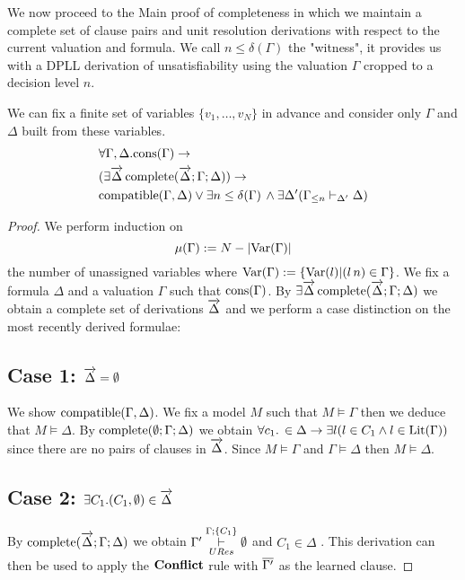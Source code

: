 We now proceed to the Main proof of completeness in which we maintain a complete set of clause pairs and unit resolution derivations with respect to the current valuation and formula. We call $n \leq \delta(\Gamma)$  the "witness", it provides us with a DPLL derivation of unsatisfiability using the valuation $\Gamma$ cropped to a decision level $n$.\\
\medskip
\begin{mytheorem}\label{thm:moddpllcompleteness} 
We can fix a finite set of variables $\{v_1, \ldots , v_N \}$ in advance and consider only $\Gamma$ and $\Delta$ built from these variables.
\begin{align*}
 &\forall \Gamma, \Delta. \mathrm{cons}(\Gamma) \to   \\ 
& (\exists \overrightarrow{\Delta} \, \mathrm{complete}(\overrightarrow{\Delta};\Gamma; \Delta)) \to \\
&\mathrm{compatible}(\Gamma,\Delta) \vee  \exists n \leq \delta(\Gamma) \, \wedge  \exists \Delta' ( \Gamma_{\leq n}  \vdash_{\Delta'} \Delta)
\end{align*}
%
\begin{proof}
We perform induction on  
$$\mu(\Gamma) := N - |\mathrm{Var}(\Gamma)|$$
the number of unassigned variables where $\mathrm{Var}(\Gamma) := \{\mathrm{Var}(l)| (l \, n) \in \Gamma \}$.
%
We fix a formula $\Delta$ and a valuation $\Gamma$ such that $\mathrm{cons}(\Gamma)$. By $\exists \overrightarrow{\Delta} \, \mathrm{complete}(\overrightarrow{\Delta};\Gamma; \Delta) $ we obtain a complete set of derivations $\overrightarrow{\Delta}$ and we perform a case distinction on the most recently derived formulae:

\subsection*{Case 1: $\overrightarrow{\Delta} = \emptyset$}
We show $\mathrm{compatible}(\Gamma,\Delta)$. We fix a model $M$ such that $M \models \Gamma$ then we  deduce that $M \models \Delta$. By $\mathrm{complete}(\emptyset;\Gamma; \Delta)$ we obtain $\forall c_1. \, \in \Delta \to \exists l( l \in C_1 \wedge l \in \mathrm{Lit}(\Gamma))$ since there are no pairs of clauses in $\overrightarrow{\Delta}$. Since $M \models \Gamma$ and $\Gamma \models \Delta$ then $M \models \Delta$.

\subsection*{Case 2: $\exists C_1. (C_1, \emptyset) \in \overrightarrow{\Delta}$}
By $\mathrm{complete}(\overrightarrow{\Delta};\Gamma; \Delta)$ we obtain $\Gamma' \overset{\Gamma;\{ C_1 \} }{\underset{URes}{\vdash}} \emptyset$ and $C_1 \in \Delta$ . This derivation can then be used to apply the $\mathbf{Conflict}$ rule with $\overline{\Gamma'}$ as the learned clause. 
%

\end{proof}
\end{mytheorem}
